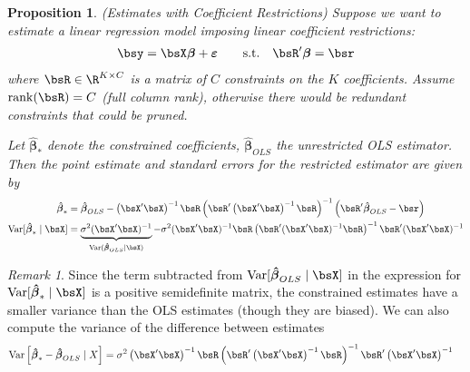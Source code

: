 \documentclass[12pt]{article}
\theoremstyle{plain}
\newtheorem{prop}[thm]{Proposition}
\theoremstyle{definition}
\theoremstyle{remark}
\newtheorem*{rmk}{Remark}
\newcommand{\bsvarepsilon}{\boldsymbol{\varepsilon}}
\newcommand{\bsbeta}{\boldsymbol{\beta}}
\newcommand{\bshatbeta}{\boldsymbol{\hat{\beta}}}
\newcommand{\rank}{\operatorname{rank}}
\newcommand{\Var}{\operatorname{Var}}
\begin{document}
\begin{prop}\emph{(Estimates with Coefficient Restrictions)}
\label{prop:coeffrestrictions}
Suppose we want to estimate a linear regression model imposing linear
coefficient restrictions:
\begin{align*}
  \bsy = \bsX\bsbeta + \bsvarepsilon
  \qquad
  \text{s.t.}
  \quad
  \bsR'\bsbeta = \bsr
\end{align*}
where $\bsR\in\R^{K\times C}$ is a matrix of $C$ constraints on the $K$
coefficients. Assume $\rank(\bsR)=C$ (full column rank), otherwise there
would be redundant constraints that could be pruned.

Let $\bshatbeta_*$ denote the constrained coefficients,
$\bshatbeta_{OLS}$ the unrestricted OLS estimator. Then
the point estimate and standard errors for the restricted estimator are
given by
\begin{align*}
  \bshatbeta_*
  &=
  \bshatbeta_{OLS} - \left(\bsX'\bsX\right)^{-1}  \bsR
  \left(\bsR'\left(\bsX'\bsX\right)^{-1}  \bsR\right)^{-1}
  \left(\bsR'\bshatbeta_{OLS} -  \bsr\right)
  \\
  \Var[\bshatbeta_*\;|\;\bsX]
  &=
  \underbrace{\sigma^2(\bsX'\bsX)^{-1}}_{\Var(\bshatbeta_{OLS}|\bsX)}
  -
  \sigma^2(\bsX'\bsX)^{-1}  \bsR
  \left(\bsR'(\bsX'\bsX)^{-1}  \bsR\right)^{-1} \bsR'(\bsX'\bsX)^{-1}
\end{align*}
\end{prop}
\begin{rmk}
Since the term subtracted from $\Var[\bshatbeta_{OLS}\;|\;\bsX]$ in the
expression for $\Var[\bshatbeta_*\;|\;\bsX]$ is a positive semidefinite
matrix, the constrained estimates have a smaller variance than the OLS
estimates (though they are biased).
We can also compute the variance of the difference between estimates
\begin{align*}
  \Var\left[ \bshatbeta_*-\bshatbeta_{OLS} \;|\;X\right]
  &=
  \sigma^2
  \left(\bsX'\bsX\right)^{-1}  \bsR
  \left(\bsR'\left(\bsX'\bsX\right)^{-1}  \bsR\right)^{-1} \bsR'
  \left(\bsX'\bsX\right)^{-1}
\end{align*}
\end{rmk}
\end{document}
